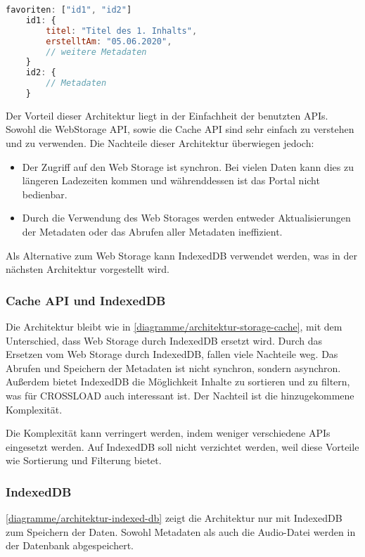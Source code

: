 \begin{lstlisting}[language=JavaScript,caption={Speichern der Ids in einem Array},label={metadaten-ids-array}]
    favoriten: ["id1", "id2"]
    id1: {
    	titel: "Titel des 1. Inhalts",
    	erstelltAm: "05.06.2020",
    	// weitere Metadaten
    }
    id2: { 
    	// Metadaten
    }
\end{lstlisting}

Der Vorteil dieser Architektur liegt in der Einfachheit der benutzten \acp{API}. Sowohl die WebStorage \ac{API}, sowie die Cache \ac{API} sind sehr einfach zu verstehen und zu verwenden. Die Nachteile dieser Architektur überwiegen jedoch:

\begin{itemize}
\item Der Zugriff auf den Web Storage ist synchron. Bei vielen Daten kann dies zu längeren Ladezeiten kommen und währenddessen ist das Portal nicht bedienbar. 
\item Durch die Verwendung des Web Storages werden entweder Aktualisierungen der Metadaten oder das Abrufen aller Metadaten ineffizient. 
\end{itemize}

Als Alternative zum Web Storage kann IndexedDB verwendet werden, was in der nächsten Architektur vorgestellt wird.

\subsubsection{Cache API und IndexedDB}
Die Architektur bleibt wie in \autoref{diagramme/architektur-storage-cache}, mit dem Unterschied, dass Web Storage durch IndexedDB ersetzt wird. Durch das Ersetzen vom Web Storage durch IndexedDB, fallen viele Nachteile weg. Das Abrufen und Speichern der Metadaten ist nicht synchron, sondern asynchron. Außerdem bietet IndexedDB die Möglichkeit Inhalte zu sortieren und zu filtern, was für CROSSLOAD auch interessant ist. Der Nachteil ist die hinzugekommene Komplexität. 

Die Komplexität kann verringert werden, indem weniger verschiedene \acp{API} eingesetzt werden. Auf IndexedDB soll nicht verzichtet werden, weil diese Vorteile wie Sortierung und Filterung bietet. 

\subsubsection{IndexedDB}
\autoref{diagramme/architektur-indexed-db} zeigt die Architektur nur mit IndexedDB zum Speichern der Daten. Sowohl Metadaten als auch die Audio-Datei werden in der Datenbank abgespeichert. 


